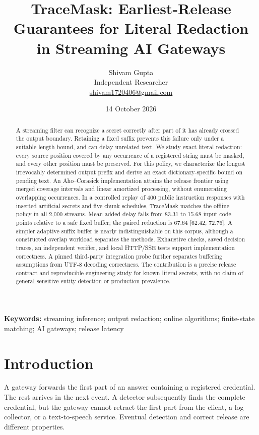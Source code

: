 \documentclass[11pt,a4paper]{article}
\title{\textbf{TraceMask: Earliest-Release Guarantees for Literal Redaction in Streaming AI Gateways}}
\author{Shivam Gupta\\Independent Researcher\\\small\href{mailto:shivam1720406@gmail.com}{shivam1720406@gmail.com}}
\date{14 October 2026}
\begin{document}
\maketitle
\begin{abstract}
A streaming filter can recognize a secret correctly after part of it has already crossed the output boundary. Retaining a fixed suffix prevents this failure only under a suitable length bound, and can delay unrelated text. We study exact literal redaction: every source position covered by any occurrence of a registered string must be masked, and every other position must be preserved. For this policy, we characterize the longest irrevocably determined output prefix and derive an exact dictionary-specific bound on pending text. An Aho--Corasick implementation attains the release frontier using merged coverage intervals and linear amortized processing, without enumerating overlapping occurrences. In a controlled replay of 400 public instruction responses with inserted artificial secrets and five chunk schedules, TraceMask matches the offline policy in all 2,000 streams. Mean added delay falls from 83.31 to 15.68 input code points relative to a safe fixed buffer; the paired reduction is 67.64 [62.42, 72.76]. A simpler adaptive suffix buffer is nearly indistinguishable on this corpus, although a constructed overlap workload separates the methods. Exhaustive checks, saved decision traces, an independent verifier, and local HTTP/SSE tests support implementation correctness. A pinned third-party integration probe further separates buffering assumptions from UTF-8 decoding correctness. The contribution is a precise release contract and reproducible engineering study for known literal secrets, with no claim of general sensitive-entity detection or production prevalence.
\end{abstract}
\noindent\textbf{Keywords:} streaming inference; output redaction; online algorithms; finite-state matching; AI gateways; release latency

\section{Introduction}
A gateway forwards the first part of an answer containing a registered credential. The rest arrives in the next event. A detector subsequently finds the complete credential, but the gateway cannot retract the first part from the client, a log collector, or a text-to-speech service. Eventual detection and correct release are different properties.
\end{document}
